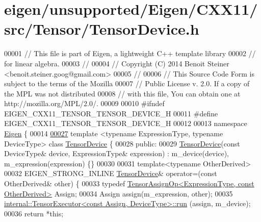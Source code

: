 \hypertarget{eigen_2unsupported_2_eigen_2_c_x_x11_2src_2_tensor_2_tensor_device_8h_source}{}\section{eigen/unsupported/\+Eigen/\+C\+X\+X11/src/\+Tensor/\+Tensor\+Device.h}
\label{eigen_2unsupported_2_eigen_2_c_x_x11_2src_2_tensor_2_tensor_device_8h_source}

\begin{DoxyCode}
00001 \textcolor{comment}{// This file is part of Eigen, a lightweight C++ template library}
00002 \textcolor{comment}{// for linear algebra.}
00003 \textcolor{comment}{//}
00004 \textcolor{comment}{// Copyright (C) 2014 Benoit Steiner <benoit.steiner.goog@gmail.com>}
00005 \textcolor{comment}{//}
00006 \textcolor{comment}{// This Source Code Form is subject to the terms of the Mozilla}
00007 \textcolor{comment}{// Public License v. 2.0. If a copy of the MPL was not distributed}
00008 \textcolor{comment}{// with this file, You can obtain one at http://mozilla.org/MPL/2.0/.}
00009 
00010 \textcolor{preprocessor}{#ifndef EIGEN\_CXX11\_TENSOR\_TENSOR\_DEVICE\_H}
00011 \textcolor{preprocessor}{#define EIGEN\_CXX11\_TENSOR\_TENSOR\_DEVICE\_H}
00012 
00013 \textcolor{keyword}{namespace }\hyperlink{namespace_eigen}{Eigen} \{
00014 
\hyperlink{class_eigen_1_1_tensor_device}{00027} \textcolor{keyword}{template} <\textcolor{keyword}{typename} ExpressionType, \textcolor{keyword}{typename} DeviceType> \textcolor{keyword}{class }\hyperlink{class_eigen_1_1_tensor_device}{TensorDevice} \{
00028   \textcolor{keyword}{public}:
00029     \hyperlink{class_eigen_1_1_tensor_device}{TensorDevice}(\textcolor{keyword}{const} DeviceType& device, ExpressionType& expression) : m\_device(device), 
      m\_expression(expression) \{\}
00030 
00031     \textcolor{keyword}{template}<\textcolor{keyword}{typename} OtherDerived>
00032     EIGEN\_STRONG\_INLINE \hyperlink{class_eigen_1_1_tensor_device}{TensorDevice}& operator=(\textcolor{keyword}{const} OtherDerived& other) \{
00033       \textcolor{keyword}{typedef} \hyperlink{class_eigen_1_1_tensor_assign_op}{TensorAssignOp<ExpressionType, const OtherDerived>}
       Assign;
00034       Assign assign(m\_expression, other);
00035       \hyperlink{class_eigen_1_1internal_1_1_tensor_executor}{internal::TensorExecutor<const Assign, DeviceType>::run}
      (assign, m\_device);
00036       \textcolor{keywordflow}{return} *\textcolor{keyword}{this};

\end{DoxyCode}
